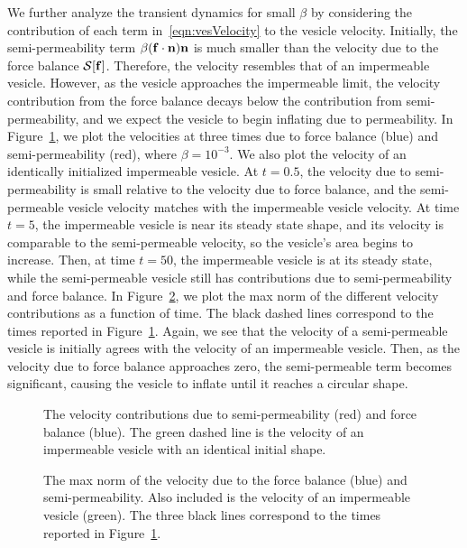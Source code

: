 \documentclass[aps,prl,showpacs]{revtex4}
\newif\ifTikz
\begin{document}
We further analyze the transient dynamics for small $\beta$ by
considering the contribution of each term in~\eqref{eqn:vesVelocity} to
the vesicle velocity. Initially, the semi-permeability term $\beta(\mathbf{f}
\cdot \mathbf{n})\mathbf{n}$ is much smaller than the velocity due to the force
balance $\mathcal{S}[\mathbf{f}]$. Therefore, the velocity resembles that of an
impermeable vesicle. However, as the vesicle approaches the impermeable
limit, the velocity contribution from the force balance decays below the
contribution from semi-permeability, and we expect the vesicle to begin
inflating due to permeability. In Figure~\ref{fig:vesVelocity}, we plot
the velocities at three times due to force balance (blue) and
semi-permeability (red), where $\beta = 10^{-3}$. We also plot the
velocity of an identically initialized impermeable vesicle. At $t=0.5$,
the velocity due to semi-permeability is small relative to the velocity
due to force balance, and the semi-permeable vesicle velocity matches
with the impermeable vesicle velocity. At time $t=5$, the impermeable
vesicle is near its steady state shape, and its velocity is comparable
to the semi-permeable velocity, so the vesicle's area begins to
increase. Then, at time $t=50$, the impermeable vesicle is at its steady
state, while the semi-permeable vesicle still has contributions due to
semi-permeability and force balance. In
Figure~\ref{fig:vesVelocityNorm}, we plot the max norm of the different
velocity contributions as a function of time. The black dashed lines
correspond to the times reported in Figure~\ref{fig:vesVelocity}. Again,
we see that the velocity of a semi-permeable vesicle is initially agrees
with the velocity of an impermeable vesicle. Then, as the velocity due
to force balance approaches zero, the semi-permeable term becomes
significant, causing the vesicle to inflate until it reaches a circular
shape.

\begin{figure}[htp]
  \centering
  \ifTikz
  
  
  
  \fi
  \caption{\label{fig:vesVelocity} The velocity contributions due to
  semi-permeability (red) and force balance (blue). The green dashed
  line is the velocity of an impermeable vesicle with an identical
  initial shape.}
\end{figure}

\begin{figure}[htp]
  \ifTikz
  
  \fi
  \caption{\label{fig:vesVelocityNorm} The max norm of the velocity due
  to the force balance (blue) and semi-permeability. Also included is
  the velocity of an impermeable vesicle (green). The three black lines
  correspond to the times reported in Figure~\ref{fig:vesVelocity}.}
\end{figure}
\end{document}

